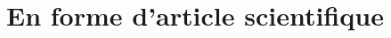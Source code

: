 \section{En forme d'article scientifique}
\begin{multicols}{2}
    \blindmathtrue
    \blindtext[10]

\end{multicols}